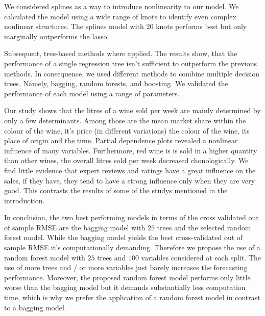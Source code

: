 \documentclass[11pt,]{article}
\begin{document}
We considered splines as a way to introduce nonlinearity to our model.
We calculated the model using a wide range of knots to identify even
complex nonlinear structures. The splines model with \(20\) knots
performs best but only marginally outperforms the \ac{lasso}.

Subsequent, tree-based methods where applied. The results show, that the
performance of a single regression tree isn't sufficient to outperform
the previous methods. In consequence, we used different methods to
combine multiple decision trees. Namely, bagging, random forests, and
boosting. We validated the performance of each model using a range of
parameters.

Our study shows that the litres of a wine sold per week are mainly
determined by only a few determinants. Among those are the mean market
share within the colour of the wine, it's price (in different
variations) the colour of the wine, its place of origin and the time.
Partial dependence plots revealed a nonlinear influence of many
variables. Furthermore, red wine is is sold in a higher quantity than
other wines, the overall litres sold per week decreased chonologically.
We find little evidence that expert reviews and ratings have a great
influence on the sales, if they have, they tend to have a strong
influence only when they are very good. This contrasts the results of
some of the studys mentioned in the introduction.

In conclusion, the two best performing models in terms of the cross
validated out of sample \ac{RMSE} are the bagging model with \(25\)
trees and the selected random forest model. While the bagging model
yields the best cross-validated out of sample \ac{RMSE} it's
computationally demanding. Therefore we propose the use of a random
forest model with \(25\) trees and \(100\) variables considered at each
split. The use of more trees and / or more variables just barely
increases the forecasting performance. Moreover, the proposed random
forest model performs only little worse than the \ac{bagging} model but
it demands substantially less computation time, which is why we prefer
the application of a random forest model in contrast to a bagging model.

\pagebreak

\printbibliography[title = References]
\cleardoublepage

\begin{refsection}
\nocite{R-base}
\nocite{R-broom}
\nocite{R-dplyr}
\nocite{R-ggplot2}
\nocite{R-haven}
\nocite{R-lmtest}
\nocite{R-PerformanceAnalytics}
\nocite{R-rstudioapi}
\nocite{R-sandwich}
\nocite{R-stargazer}
\nocite{R-svMisc}
\nocite{R-tidyr}
\nocite{R-xts}
\nocite{R-Studio}
\printbibliography[title = Software-References]
\end{refsection}
\end{document}
